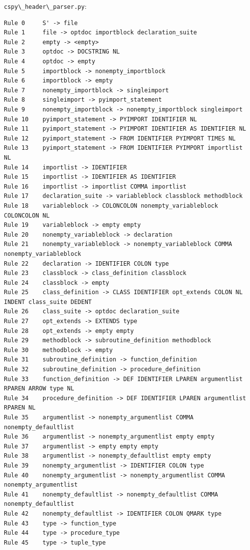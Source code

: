 \documentclass{article}
\begin{document}
\pagebreak
\noindent \verb|cspy\_header\_parser.py|:
\begin{verbatim}
Rule 0     S' -> file
Rule 1     file -> optdoc importblock declaration_suite
Rule 2     empty -> <empty>
Rule 3     optdoc -> DOCSTRING NL
Rule 4     optdoc -> empty
Rule 5     importblock -> nonempty_importblock
Rule 6     importblock -> empty
Rule 7     nonempty_importblock -> singleimport
Rule 8     singleimport -> pyimport_statement
Rule 9     nonempty_importblock -> nonempty_importblock singleimport
Rule 10    pyimport_statement -> PYIMPORT IDENTIFIER NL
Rule 11    pyimport_statement -> PYIMPORT IDENTIFIER AS IDENTIFIER NL
Rule 12    pyimport_statement -> FROM IDENTIFIER PYIMPORT TIMES NL
Rule 13    pyimport_statement -> FROM IDENTIFIER PYIMPORT importlist NL
Rule 14    importlist -> IDENTIFIER
Rule 15    importlist -> IDENTIFIER AS IDENTIFIER
Rule 16    importlist -> importlist COMMA importlist
Rule 17    declaration_suite -> variableblock classblock methodblock
Rule 18    variableblock -> COLONCOLON nonempty_variableblock COLONCOLON NL
Rule 19    variableblock -> empty empty
Rule 20    nonempty_variableblock -> declaration
Rule 21    nonempty_variableblock -> nonempty_variableblock COMMA nonempty_variableblock
Rule 22    declaration -> IDENTIFIER COLON type
Rule 23    classblock -> class_definition classblock
Rule 24    classblock -> empty
Rule 25    class_definition -> CLASS IDENTIFIER opt_extends COLON NL INDENT class_suite DEDENT
Rule 26    class_suite -> optdoc declaration_suite
Rule 27    opt_extends -> EXTENDS type
Rule 28    opt_extends -> empty empty
Rule 29    methodblock -> subroutine_definition methodblock
Rule 30    methodblock -> empty
Rule 31    subroutine_definition -> function_definition
Rule 32    subroutine_definition -> procedure_definition
Rule 33    function_definition -> DEF IDENTIFIER LPAREN argumentlist RPAREN ARROW type NL
Rule 34    procedure_definition -> DEF IDENTIFIER LPAREN argumentlist RPAREN NL
Rule 35    argumentlist -> nonempty_argumentlist COMMA nonempty_defaultlist
Rule 36    argumentlist -> nonempty_argumentlist empty empty
Rule 37    argumentlist -> empty empty empty
Rule 38    argumentlist -> nonempty_defaultlist empty empty
Rule 39    nonempty_argumentlist -> IDENTIFIER COLON type
Rule 40    nonempty_argumentlist -> nonempty_argumentlist COMMA nonempty_argumentlist
Rule 41    nonempty_defaultlist -> nonempty_defaultlist COMMA nonempty_defaultlist
Rule 42    nonempty_defaultlist -> IDENTIFIER COLON QMARK type
Rule 43    type -> function_type
Rule 44    type -> procedure_type
Rule 45    type -> tuple_type

\end{verbatim}
\end{document}
